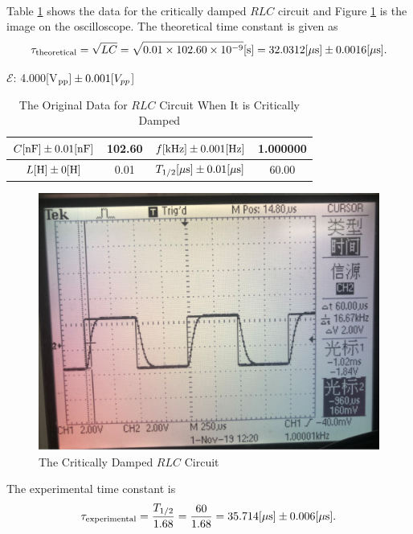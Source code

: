 \documentclass{my_template}
\newcommand{\e}{\mathcal{E}}
\begin{document}
    \paragraph{} Table \ref{tab:RLC damped} shows the data for the critically damped $RLC$ circuit and Figure \ref{fig:RLCcritical} is the image on the oscilloscope. The theoretical time constant is given as $$\tau_{\rm theoretical}=\sqrt{LC}=\sqrt{0.01\times 102.60\times 10^{-9}}[\rm s]=32.0312[\mu s]\pm 0.0016[\mu s].$$
    \begin{table}[H]
        \begin{center}
            $\e$: 4.000[V$_{\rm pp}]\pm 0.001 [V_{pp}$]
            \begin{tabular}{|c|c|c|c|}
                \hline
                $C[\rm nF]\pm 0.01[nF]$&102.60&$f[\rm kHz]\pm 0.001[Hz]$&1.000000\\\hline
                $L[\rm H]\pm 0[H]$&0.01&$T_{1/2}[\rm \mu s]\pm 0.01[\mu s]$&60.00\\\hline
            \end{tabular}
        \end{center}
        \caption{The Original Data for $RLC$ Circuit When It is Critically Damped}
        \label{tab:RLC damped}
    \end{table}
    \begin{figure}[H]
        \centering
        \includegraphics[width=\textwidth]{fig/critically.png}
        \caption{The Critically Damped $RLC$ Circuit}
        \label{fig:RLCcritical}
    \end{figure}
    The experimental time constant is $$\tau_{\rm experimental}=\frac{T_{1/2}}{1.68}=\frac{60}{1.68}=35.714[\rm\mu s]\pm 0.006[\mu s].$$
\end{document}
